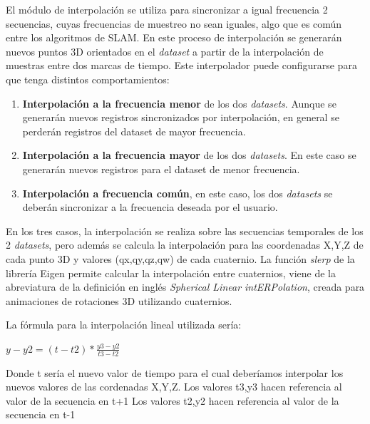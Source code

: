 	El módulo de interpolación se utiliza para sincronizar a igual frecuencia 2 secuencias, cuyas frecuencias de muestreo no sean iguales, algo que es común entre los algoritmos de SLAM.
	En este proceso de interpolación se generarán nuevos puntos 3D orientados en el \textit{dataset} a partir de la interpolación de muestras entre dos marcas de tiempo.
	Este interpolador puede configurarse para que tenga distintos comportamientos:
    \begin{enumerate}
	 
	 \item{\textbf{Interpolación a la frecuencia menor}} de los dos \textit{datasets}. Aunque se generarán nuevos registros sincronizados por interpolación, en general se perderán registros del dataset de mayor frecuencia.

	 \item{\textbf{Interpolación a la frecuencia mayor}} de los dos \textit{datasets}. En este caso se generarán nuevos registros para el dataset de menor frecuencia.

	 \item{\textbf{Interpolación a frecuencia común}}, en este caso, los dos \textit{datasets} se deberán sincronizar a la frecuencia deseada por el usuario.
	 \end{enumerate}

	 En los tres casos, la interpolación se realiza sobre las secuencias temporales de los 2 \textit{datasets}, pero además se calcula la interpolación para las coordenadas X,Y,Z de cada punto 3D y valores (qx,qy,qz,qw) de cada cuaternio. La función \textit{slerp} de la librería Eigen permite calcular la interpolación entre cuaternios, viene de la abreviatura de la definición en inglés \textit{Spherical Linear intERPolation}, creada para animaciones de rotaciones 3D utilizando cuaternios.


	 La fórmula para la interpolación lineal utilizada sería:

	 \begin{center}
	 \begin{math}
		y-y2= (t-t2)*\frac{y3-y2}{t3-t2}
	 \end{math}
	 \end{center}

	 Donde t sería el nuevo valor de tiempo para el cual deberíamos interpolar los nuevos valores de las cordenadas X,Y,Z. 
	 Los valores t3,y3 hacen referencia al valor de la secuencia en t+1
	 Los valores t2,y2 hacen referencia al valor de la secuencia en t-1

